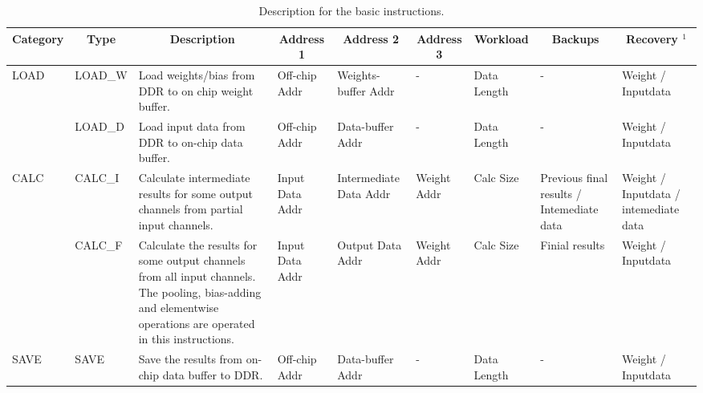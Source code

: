\label{sec:cnninterrupt}

\begin{table}[t]
	\footnotesize
	\centering
	\caption{Description for the basic instructions.}
\begin{tabular}{|p{2.7em}|p{3.4em}|p{16em}|p{4.2em}|p{4.6em}|p{4.2em}|p{4.2em}||p{7em}|p{7em}|}
	\hline
	\multicolumn{1}{|c|}{Category} & \multicolumn{1}{c|}{Type} & \multicolumn{1}{c|}{Description} & \multicolumn{1}{c|}{Address 1} & \multicolumn{1}{c|}{Address 2} & \multicolumn{1}{c|}{Address 3} & \multicolumn{1}{c||}{Workload} & \multicolumn{1}{c|}{Backups} & \multicolumn{1}{c|}{Recovery $^1$} \bigstrut\\
	\hline
	\multirow{2}[4]{*}{LOAD} & LOAD\_W & Load weights/bias from DDR to on chip weight buffer. & Off-chip Addr & Weights-buffer Addr & -     & Data  Length & -     & Weight / Inputdata \bigstrut\\
	\cline{2-9}\multicolumn{1}{|c|}{} & LOAD\_D & Load input data from DDR to on-chip data buffer. & Off-chip Addr & Data-buffer Addr & -     & Data  Length & -     & Weight / Inputdata \bigstrut\\
	\hline
	\multirow{2}[4]{*}{CALC} & CALC\_I & Calculate intermediate results for some output channels from partial  input channels. & Input  Data Addr & Intermediate Data Addr & Weight Addr & Calc Size & Previous final results / Intemediate data  & Weight / Inputdata /  intemediate data \bigstrut\\
	\cline{2-9}\multicolumn{1}{|c|}{} & CALC\_F & Calculate the results for some output channels from all input channels. The pooling, bias-adding and elementwise operations are operated in this instructions. & Input  Data Addr & Output  Data Addr & Weight Addr & Calc Size & Finial results & Weight / Inputdata \bigstrut\\
	\hline
	SAVE  & SAVE  & Save the results from on-chip data buffer to DDR. & Off-chip Addr & Data-buffer Addr & -     & Data  Length & -     & Weight / Inputdata \bigstrut\\
	\hline
	\end{tabular}%
	
	\label{tab:instr}%
  \end{table}%


